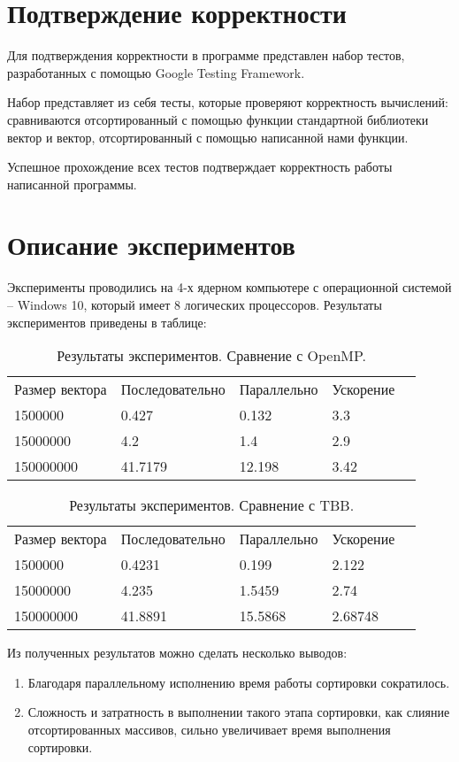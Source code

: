 \documentclass{report}
\begin{document}
\section*{Подтверждение корректности}
Для подтверждения корректности в программе представлен набор тестов, разработанных с помощью Google Testing Framework.
\par Набор представляет из себя тесты, которые проверяют корректность вычислений: сравниваются отсортированный с помощью функции стандартной библиотеки вектор и вектор, отсортированный с помощью написанной нами функции.

\par Успешное прохождение всех тестов подтверждает корректность работы написанной программы.
\newpage

\section*{Описание экспериментов}
Эксперименты проводились на 4-х ядерном компьютере с операционной системой – Windows 10, который имеет 8 логических процессоров. Результаты экспериментов приведены в таблице:
\begin{table}[!h]
\caption{Результаты экспериментов. Сравнение с OpenMP.}
\centering
\begin{tabular}{lllll}
Размер вектора & Последовательно & Параллельно & Ускорение  \\
1500000        & 0.427         & 0.132     & 3.3       \\
15000000        & 4.2         & 1.4     & 2.9       \\
150000000       & 41.7179         & 12.198     & 3.42       
\end{tabular}
\end{table}

\begin{table}[!h]
\caption{Результаты экспериментов. Сравнение с TBB.}
\centering
\begin{tabular}{lllll}
Размер вектора & Последовательно & Параллельно & Ускорение  \\
1500000        & 	0.4231         & 0.199     & 	2.122       \\
15000000        & 4.235         & 1.5459     & 2.74       \\
150000000       & 41.8891         & 15.5868     & 2.68748       
\end{tabular}
\end{table}
\par Из полученных результатов можно сделать несколько выводов:
\begin{enumerate} 
\item Благодаря параллельному исполнению время работы сортировки сократилось.
\item Сложность и затратность в выполнении такого этапа сортировки, как слияние отсортированных массивов, сильно увеличивает время выполнения сортировки.
\end{enumerate} 
\newpage
\end{document}
